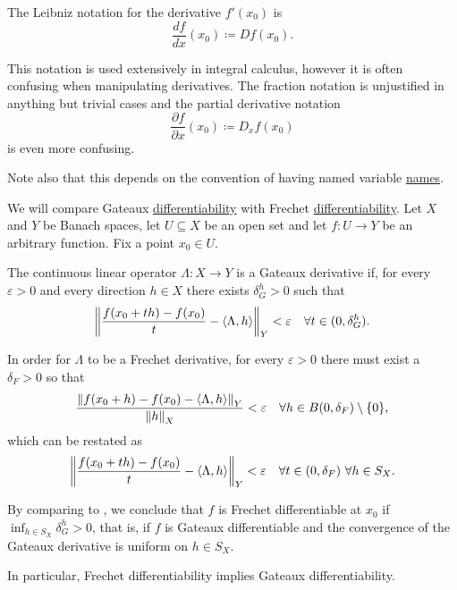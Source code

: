 \begin{remark}
\begin{RemEnum}
     The Leibniz notation for the derivative \( f'(x_0) \) is
    \begin{equation*}
      \frac {df} {dx} (x_0) \coloneqq D f(x_0).
    \end{equation*}

    This notation is used extensively in integral calculus, however it is often confusing when manipulating derivatives. The fraction notation is unjustified in anything but trivial cases and the partial derivative notation
    \begin{equation*}
      \frac {\partial f} {\partial x} (x_0) \coloneqq D_x f(x_0)
    \end{equation*}
    is even more confusing.

    Note also that this depends on the convention of having named variable \hyperref[def:function/argument]{names}.
  \end{RemEnum}
\end{remark}

\begin{remark}\label{remark:gateaux_vs_frechet}
  We will compare Gateaux \hyperref[def:differentiability/gateaux]{differentiability} with Frechet \hyperref[def:differentiability/frechet]{differentiability}. Let \( X \) and \( Y \) be Banach spaces, let \( U \subseteq X \) be an open set and let \( f: U \to Y \) be an arbitrary function. Fix a point \( x_0 \in U \).

  The continuous linear operator \( \Lambda: X \to Y \) is a Gateaux derivative if, for every \( \varepsilon > 0 \) and every direction \( h \in X \) there exists \( \delta_G^h > 0 \) such that
  \begin{equation}\label{remark:gateaux_vs_frechet/gateaux}
    \left\Vert \frac {f(x_0 + th) - f(x_0)} t - \left\langle \Lambda, h \right\rangle \right\Vert_Y < \varepsilon \quad\forall t \in (0, \delta_G^h).
  \end{equation}

  In order for \( \Lambda \) to be a Frechet derivative, for every \( \varepsilon > 0 \) there must exist a \( \delta_F > 0 \) so that
  \begin{equation*}
    \frac{\left\Vert f(x_0 + h) - f(x_0) - \left\langle \Lambda, h \right\rangle \right\Vert_Y} {\left\Vert h \right\Vert_X} < \varepsilon \quad\forall h \in B(0, \delta_F) \setminus \{ 0 \},
  \end{equation*}
  which can be restated as
  \begin{equation}\label{remark:gateaux_vs_frechet/frechet}
    \left\Vert \frac {f(x_0 + th) - f(x_0)} t - \left\langle \Lambda, h \right\rangle \right\Vert_Y < \varepsilon \quad\forall t \in (0, \delta_F) \ \forall h \in S_X.
  \end{equation}

  By comparing  to , we conclude that \( f \) is Frechet differentiable at \( x_0 \) if \( \inf_{h \in S_X} \delta^h_G > 0 \), that is, if \( f \) is Gateaux differentiable and the convergence of the Gateaux derivative is uniform on \( h \in S_X \).

  In particular, Frechet differentiability implies Gateaux differentiability.
\end{remark}
